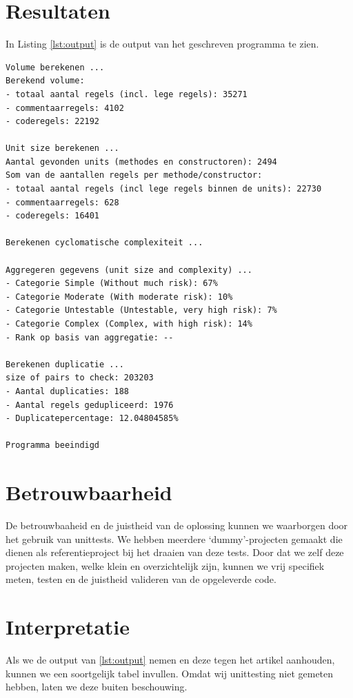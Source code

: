 \documentclass[a4paper]{article}
\begin{document}
\section{Resultaten}
In Listing \ref{lst:output} is de output van het geschreven programma te zien. 

\begin{lstlisting}[caption={Programma output},label={lst:output},frame = single]
Volume berekenen ...
Berekend volume: 
- totaal aantal regels (incl. lege regels): 35271
- commentaarregels: 4102
- coderegels: 22192

Unit size berekenen ...
Aantal gevonden units (methodes en constructoren): 2494
Som van de aantallen regels per methode/constructor:
- totaal aantal regels (incl lege regels binnen de units): 22730
- commentaarregels: 628
- coderegels: 16401

Berekenen cyclomatische complexiteit ...

Aggregeren gegevens (unit size and complexity) ...
- Categorie Simple (Without much risk): 67%
- Categorie Moderate (With moderate risk): 10%
- Categorie Untestable (Untestable, very high risk): 7%
- Categorie Complex (Complex, with high risk): 14%
- Rank op basis van aggregatie: --

Berekenen duplicatie ...
size of pairs to check: 203203
- Aantal duplicaties: 188
- Aantal regels gedupliceerd: 1976
- Duplicatepercentage: 12.04804585%

Programma beeindigd
\end{lstlisting}
 
\section{Betrouwbaarheid}
De betrouwbaaheid en de juistheid van de oplossing kunnen we waarborgen door het gebruik van unittests. 
We hebben meerdere `dummy'-projecten gemaakt die dienen als referentieproject bij het draaien van deze tests. 
Door dat we zelf deze projecten maken, welke klein en overzichtelijk zijn, kunnen we vrij specifiek meten, testen en de juistheid valideren van de opgeleverde code.

\section{Interpretatie}
Als we de output van \ref{lst:output} nemen en deze tegen het artikel aanhouden, kunnen we een soortgelijk tabel invullen. Omdat wij unittesting niet gemeten hebben, laten we deze buiten beschouwing.
\end{document}
